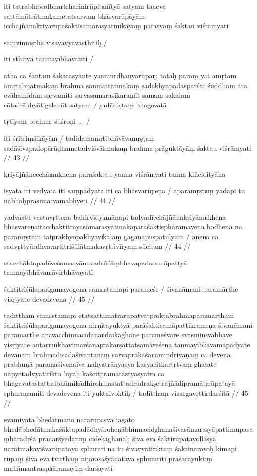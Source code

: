 iti tatrabhavadbhartṛharinirūpitanītyā satyam tadeva sattāmātrātmakametatsarvam bhāsvarūpāyām icchājñānakriyārūpaśaktisāmarasyātmikāyāṃ parasyāṃ śaktau viśrāmyati

saṃvinniṣṭhā viṣayavyavasthitiḥ  /

iti sthityā tanmayībhavatīti  /

atha ca śāntam śakārasyānte yanmūrdhanyarūpaṃ tataḥ paraṃ yat amṛtam amṛtabījātmakaṃ brahma sanmātrātmakaṃ sādākhyapadasparśāt śuddham ata evāhamidaṃ sarvamiti sarvasamarasīkaraṇāt samaṃ sakalam cātaścākhyātigalanāt satyam  / yadādiṣṭaṃ bhagavatā

tṛtīyaṃ brahma suśroṇi  ...  /

iti śrītriṃśikāyām  / tadidamamṛtībhāvāvamṛṣṭaṃ sadāśivapadopārūḍhametadviśvātmakaṃ brahma prāguktāyāṃ śaktau viśrāmyati  // 43  //

kriyājñānecchāmukhena paraśaktau yanna viśrāmyati tanna kiñcidityāha

iṣyata iti vedyata iti saṃpādyata iti ca bhāsvarūpeṇa  /
aparāmṛṣṭaṃ yadapi tu nabhaḥprasūnatvamabhyeti  // 44  //

yadvastu vastuvṛttena bahirvidyamānapi tadyadīcchājñānakriyāmukhena bhāsvareṇaitacchaktitrayasāmarasyātmakaparāśaktisphāramayena bodhena na parāmṛṣṭam tatprakhyopākhyāvikalaṃ gaganapuṣpatulyam  / anena ca sadvṛttyūrdhvavartitriśūlātmakavṛttivīryaṃ sūcitam  // 44  //

etacchāktapadāveśamasyānuvadañśāṃbhavapadasamāpattyā tanmayībhāvamāvirbhāvayati

śaktitriśūlaparigamayogena samastamapi parameśe  /
śivanāmani paramārthe visṛjyate devadevena  // 45  //

tadittham samastamapi etatsattāmātrarūpatvātproktabrahmaparamārtham śaktitriśūlaparigamayogena nirṇītayuktyā parāśaktisamāpattikrameṇa śivanāmani paramārthe anavacchinnacidānandaikaghane parameśvare svasminsvabhāve visṛjyate antarmukhavimarśanaprakarṣāttatsamāveśena tanmayībhāvamāpādyate devānām brahmādisadāśivāntānāṃ sarvaprakāśānāmindriyāṇāṃ ca devena prabhuṇā paramaśivenaiva nahyatrānyasya kasyacitkartṛtvaṃ ghaṭate nāpyetadvyatirikto 'nyaḥ kaścitpramātāstyasyaiva ca bhagavatastattadbhūmikādhirohiṇastattadrudrakṣetrajñādipramātṛrūpatayā sphuraṇamiti devadevena iti yuktaivoktiḥ  / taditthaṃ visargavṛttirdarśitā  // 45  //

evamiyatā bhedātmano nararūpasya jagato bhedābhedātmakaśāktapadādhyāroheṇābhinnacidghanaśivasāmarasyāpattimupasaṃhāradṛśā pradarśyedānīṃ cidekaghanaḥ śiva eva śaktirūpatayollāsya narātmakaviśvarūpatayā sphurati na tu śivavyatiriktaṃ śaktinarayoḥ kimapi rūpaṃ śiva eva tvitthaṃ nijarasāśyānatayā sphuratīti prasarayuktiṃ mahāmantrasphāramayīṃ darśayati

